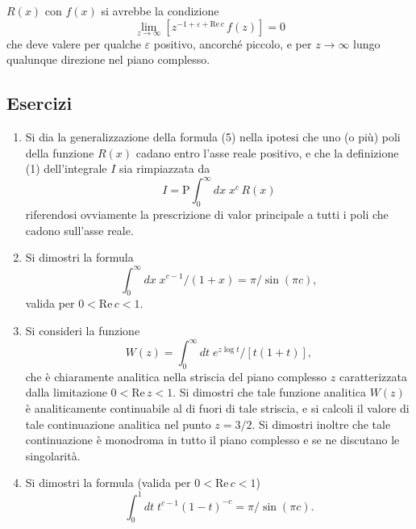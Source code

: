 \documentclass[11pt, a4paper]{book}
\numberwithin{equation}{section}
\newenvironment{esercizi}{\subsection*{Esercizi}\begin{enumerate}}{\end{enumerate}}
\begin{document}

$R(x)$ con $f(x)$ si avrebbe la condizione
\begin{equation}
    \lim_{z \to \infty} \left[z^{-1+\varepsilon+\mathrm{Re}\, c}\, f(z)\right] = 0 \tag{23}
\end{equation}
che deve valere per qualche $\varepsilon$ positivo, ancorché piccolo, e per
$z \to \infty$ lungo qualunque direzione nel piano complesso.

\begin{esercizi}
\item Si dia la generalizzazione della formula (5) nella ipotesi che uno (o più)
    poli della funzione $R(x)$ cadano entro l'asse reale positivo, e che la
    definizione (1) dell'integrale $I$ sia rimpiazzata da
    \[
        I = \mathrm{P}\int_0^\infty dx\; x^c\, R(x)
    \]
    riferendosi ovviamente la prescrizione di valor principale a tutti i poli
    che cadono sull'asse reale.

\item Si dimostri la formula
    \[
        \int_0^\infty dx\; x^{c-1}/(1+x) = \pi/\sin(\pi c),
    \]
    valida per $0 < \mathrm{Re}\, c < 1$.

\item Si consideri la funzione
    \[
        W(z) = \int_0^\infty dt\; e^{z \log t} / \left[t(1+t)\right],
    \]
    che è chiaramente analitica nella striscia del piano complesso $z$ caratterizzata
    dalla limitazione $0 < \mathrm{Re}\, z < 1$. Si dimostri che tale funzione
    analitica $W(z)$ è analiticamente continuabile al di fuori di tale striscia, e
    si calcoli il valore di tale continuazione analitica nel punto $z = 3/2$. Si
    dimostri inoltre che tale continuazione è monodroma in tutto il piano complesso
    e se ne discutano le singolarità.

\item Si dimostri la formula (valida per $0 < \mathrm{Re}\, c < 1$)
    \[
        \int_0^1 dt\; t^{c-1}(1-t)^{-c} = \pi/\sin(\pi c).
    \]


\end{esercizi}
\end{document}

